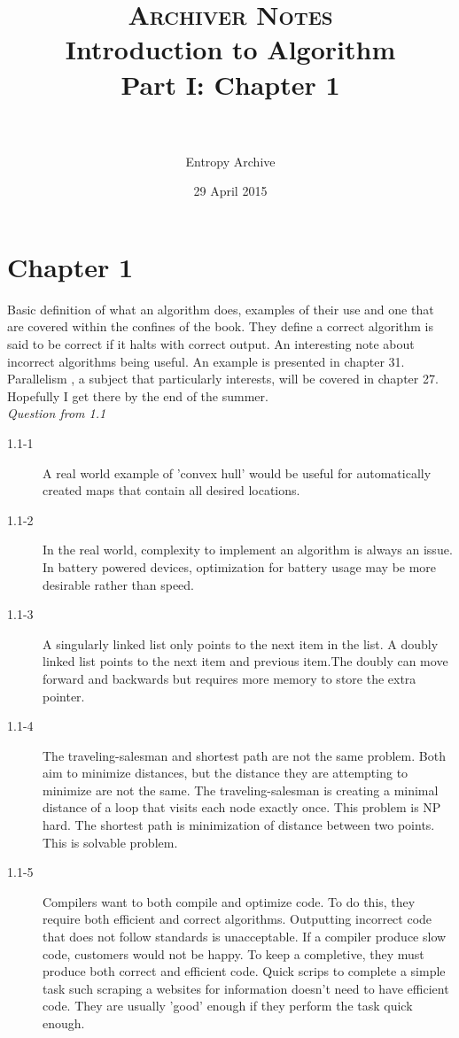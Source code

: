 \documentclass{article}
\title{
    \normalfont \normalsize
    \textsc{Archiver Notes} 
    \horrule{0.5pt} \\
    \huge Introduction to Algorithm \\
    \small Part I: Chapter 1\\
    \horrule{2pt} \\
}
\author{Entropy Archive}
\date{\normalsize 29 April 2015}
\begin{document}
\maketitle
\section*{Chapter 1}
Basic definition of what an algorithm does, examples of their use and one that
are covered within the confines of the book. They define a correct algorithm is
said to be correct if it halts with correct output. An interesting note about
incorrect algorithms being useful. An example is presented in chapter 31.
Parallelism , a subject that particularly interests, will be covered in chapter
27. Hopefully I get there by the end of the summer.\\ 

\textit{Question from 1.1}
\begin{description}
\item[1.1-1] 
A real world example of 'convex hull' would be useful for automatically created
maps that contain all desired locations. 
\item[1.1-2]
In the real world, complexity to implement an algorithm is always an issue. In
battery powered devices, optimization for battery usage may be more desirable
rather than speed.   
\item[1.1-3] A singularly linked list only points to the next item in the list.
A doubly linked list points to the next item and previous item.The doubly can
move forward and backwards but requires more memory to store the extra pointer.
\item[1.1-4] The traveling-salesman and shortest path are not the same problem.
Both aim to minimize distances, but the distance they are attempting to
minimize are not the same. The traveling-salesman is creating a minimal
distance of a loop that visits each node exactly once. This problem is NP hard.
The shortest path is minimization of distance between two points. This is
solvable problem. 
\item[1.1-5] Compilers want to both compile and optimize code. To do this, they
require both efficient and correct algorithms. Outputting incorrect code that
does not follow standards is unacceptable. If a compiler produce slow code,
customers would not be happy. To keep a completive, they must produce both
correct and efficient code. Quick scrips to complete a simple task such
scraping a websites for information doesn't need to have efficient code. They
are usually 'good' enough if they perform the task quick enough.    
\end{description}
\end{document}
